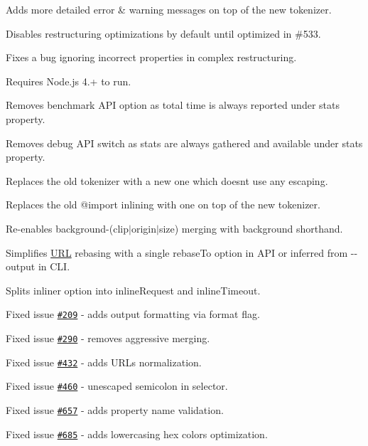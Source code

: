 \begin{DoxyItemize}
\item Adds more detailed error \& warning messages on top of the new tokenizer.
\item Disables restructuring optimizations by default until optimized in \#533.
\item Fixes a bug ignoring incorrect properties in complex restructuring.
\item Requires Node.\+js 4.+ to run.
\item Removes {\ttfamily benchmark} A\+PI option as total time is always reported under {\ttfamily stats} property.
\item Removes {\ttfamily debug} A\+PI switch as stats are always gathered and available under {\ttfamily stats} property.
\item Replaces the old tokenizer with a new one which doesn\textquotesingle{}t use any escaping.
\item Replaces the old {\ttfamily @import} inlining with one on top of the new tokenizer.
\item Re-\/enables {\ttfamily background-\/(clip$\vert$origin$\vert$size)} merging with {\ttfamily background} shorthand.
\item Simplifies \mbox{\hyperlink{namespace_u_r_l}{U\+RL}} rebasing with a single {\ttfamily rebase\+To} option in A\+PI or inferred from {\ttfamily -\/-\/output} in C\+LI.
\item Splits {\ttfamily inliner} option into {\ttfamily inline\+Request} and {\ttfamily inline\+Timeout}.
\item Fixed issue \href{https://github.com/jakubpawlowicz/clean-css/issues/209}{\tt \#209} -\/ adds output formatting via {\ttfamily format} flag.
\item Fixed issue \href{https://github.com/jakubpawlowicz/clean-css/issues/290}{\tt \#290} -\/ removes aggressive merging.
\item Fixed issue \href{https://github.com/jakubpawlowicz/clean-css/issues/432}{\tt \#432} -\/ adds U\+R\+Ls normalization.
\item Fixed issue \href{https://github.com/jakubpawlowicz/clean-css/issues/460}{\tt \#460} -\/ unescaped semicolon in selector.
\item Fixed issue \href{https://github.com/jakubpawlowicz/clean-css/issues/657}{\tt \#657} -\/ adds property name validation.
\item Fixed issue \href{https://github.com/jakubpawlowicz/clean-css/issues/685}{\tt \#685} -\/ adds lowercasing hex colors optimization.

\end{DoxyItemize}
